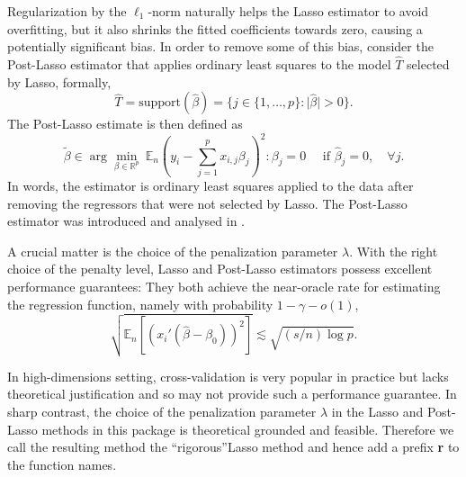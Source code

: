 \documentclass{amsart}\usepackage[]{graphicx}\usepackage[]{color}
\begin{document}
Regularization by the $\ell_1$-norm naturally helps the Lasso estimator to avoid overfitting, but it also shrinks the fitted coefficients towards zero, causing a potentially significant bias. In order to remove some of this bias,  consider the Post-Lasso estimator that applies ordinary least squares to the model $\hat{T}$ selected by Lasso, formally, 
\[ \hat{T} = \text{support}(\hat{\beta}) = \{ j \in \{ 1, \ldots,p\}: \lvert \hat{\beta} \rvert >0 \}. \]
The Post-Lasso estimate is then defined as
\[ \tilde{\beta} \in \arg\min_{\beta \in \mathbb{R}^p}  \ \mathbb{E}_n \left( y_i - \sum_{j=1}^p x_{i,j} \beta_j \right) ^2: \beta_j=0 \quad \text{ if } \hat \beta_j = 0 , \quad \forall j. \]
In words, the estimator is ordinary least squares applied to the data after removing the regressors that were not selected by Lasso. The Post-Lasso estimator was introduced and analysed in \citet{BC-Postlasso}.


A crucial matter is the choice of the penalization parameter $\lambda$.   With the right choice
of the penalty level, Lasso and Post-Lasso estimators possess excellent performance guarantees: They both achieve the near-oracle rate for estimating the regression function, namely with probability $1- \gamma - o(1)$,
\[
\sqrt{\mathbb{E}_n [ (x_{i}'(\hat \beta - \beta_0))^2 ] } \lesssim \sqrt{(s/n) \log p}. 
\]

In high-dimensions setting, cross-validation is very popular in practice but lacks theoretical justification and so may not provide such a performance guarantee. In sharp contrast, the choice of the penalization parameter $\lambda$ in the Lasso and Post-Lasso methods in this package is theoretical grounded and feasible. Therefore we call the resulting method the \textquotedblleft rigorous\textquotedblright  Lasso method and hence add a prefix \textbf{r} to the function names.
\end{document}

